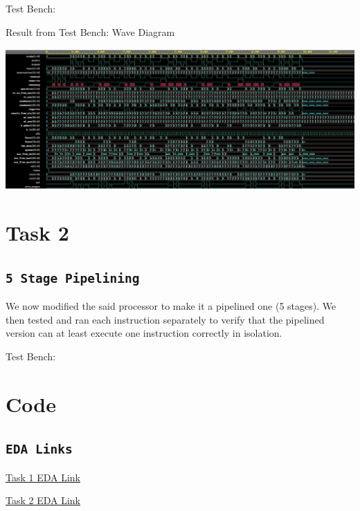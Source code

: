 \documentclass[a4paper, 12pt]{report}
\begin{document}
    
    Test Bench:
    
    \newpage
    Result from Test Bench: \newline
    Wave Diagram \newline
    \begin{center}
        \includegraphics[width=165mm]{images/task1.jpg}
    \end{center}
   
   \chapter{Task 2}
    \section{\texttt{5 Stage Pipelining}}
    We now modified the said processor to make it a pipelined one (5 stages). We then tested and ran each instruction separately to verify that the pipelined version can at least execute one instruction correctly in isolation.

    
    Test Bench:
    
   
   
    
%     
%     
    
   \chapter{Code}
    \section{\texttt{EDA Links}}
    
    \href{https://edaplayground.com/x/NxwY}{Task 1 EDA Link}
    
    \href{https://edaplayground.com/x/G8_E}{Task 2 EDA Link}
        


\end{document}
